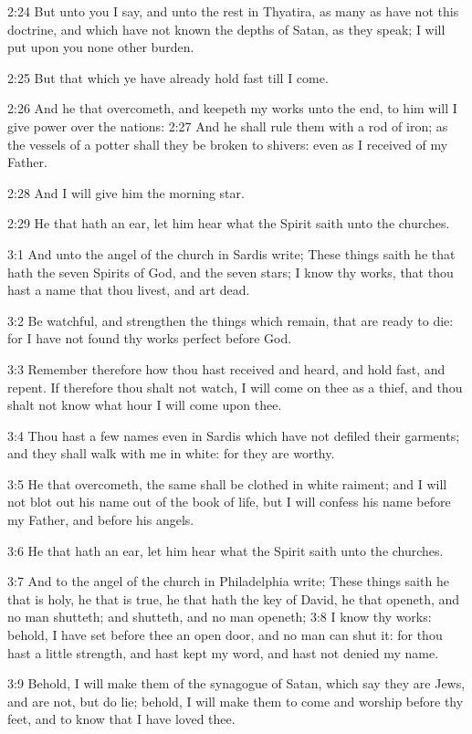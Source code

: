 2:24 But unto you I say, and unto the rest in Thyatira, as many as
have not this doctrine, and which have not known the depths of Satan,
as they speak; I will put upon you none other burden.

2:25 But that which ye have already hold fast till I come.

2:26 And he that overcometh, and keepeth my works unto the end, to him
will I give power over the nations: 2:27 And he shall rule them with a
rod of iron; as the vessels of a potter shall they be broken to
shivers: even as I received of my Father.

2:28 And I will give him the morning star.

2:29 He that hath an ear, let him hear what the Spirit saith unto the
churches.

3:1 And unto the angel of the church in Sardis write; These things
saith he that hath the seven Spirits of God, and the seven stars; I
know thy works, that thou hast a name that thou livest, and art dead.

3:2 Be watchful, and strengthen the things which remain, that are
ready to die: for I have not found thy works perfect before God.

3:3 Remember therefore how thou hast received and heard, and hold
fast, and repent. If therefore thou shalt not watch, I will come on
thee as a thief, and thou shalt not know what hour I will come upon
thee.

3:4 Thou hast a few names even in Sardis which have not defiled their
garments; and they shall walk with me in white: for they are worthy.

3:5 He that overcometh, the same shall be clothed in white raiment;
and I will not blot out his name out of the book of life, but I will
confess his name before my Father, and before his angels.

3:6 He that hath an ear, let him hear what the Spirit saith unto the
churches.

3:7 And to the angel of the church in Philadelphia write; These things
saith he that is holy, he that is true, he that hath the key of David,
he that openeth, and no man shutteth; and shutteth, and no man
openeth; 3:8 I know thy works: behold, I have set before thee an open
door, and no man can shut it: for thou hast a little strength, and
hast kept my word, and hast not denied my name.

3:9 Behold, I will make them of the synagogue of Satan, which say they
are Jews, and are not, but do lie; behold, I will make them to come
and worship before thy feet, and to know that I have loved thee.

